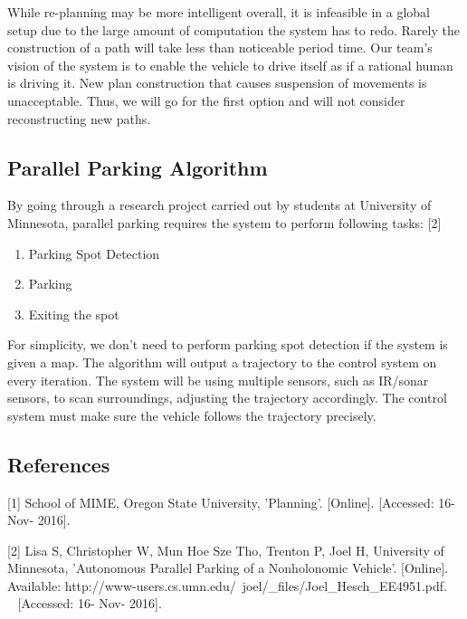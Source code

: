 \documentclass[compsoc,draftclsnofoot,onecolumn,10pt]{IEEEtran}
\begin{document}
While re-planning may be more intelligent overall, it is infeasible in a global 
setup due to the large amount of computation the system has to redo. Rarely the 
construction of a path will take less than noticeable period time. Our team's 
vision of the system is to enable the vehicle to drive itself as if a rational 
human is driving it. New plan construction that causes suspension of movements is 
unacceptable. Thus, we will go for the first option and will not consider 
reconstructing new paths.\par

\subsection{Parallel Parking Algorithm}
By going through a research project carried out by students at University of 
Minnesota, parallel parking requires the system to perform following tasks: [2]\par

\begin{enumerate}
\item Parking Spot Detection
\item Parking
\item Exiting the spot
\end{enumerate}

For simplicity, we don't need to perform parking spot detection if the system 
is given a map. The algorithm will output a trajectory to the control system on 
every iteration. The system will be using multiple sensors, such as IR/sonar 
sensors, to scan surroundings, adjusting the trajectory accordingly. The control 
system must make sure the vehicle follows the trajectory precisely.\par

\subsection{References}
[1] School of MIME, Oregon State University, 'Planning'. [Online].
[Accessed: 16- Nov- 2016].\par

[2] Lisa S, Christopher W, Mun Hoe Sze Tho, Trenton P, Joel H, University 
of Minnesota, 'Autonomous Parallel Parking of a Nonholonomic Vehicle'. [Online]. 
Available: http://www-users.cs.umn.edu/~joel/\_files/Joel\_Hesch\_EE4951.pdf.\\~ 
[Accessed: 16- Nov- 2016].\par


\end{document}
